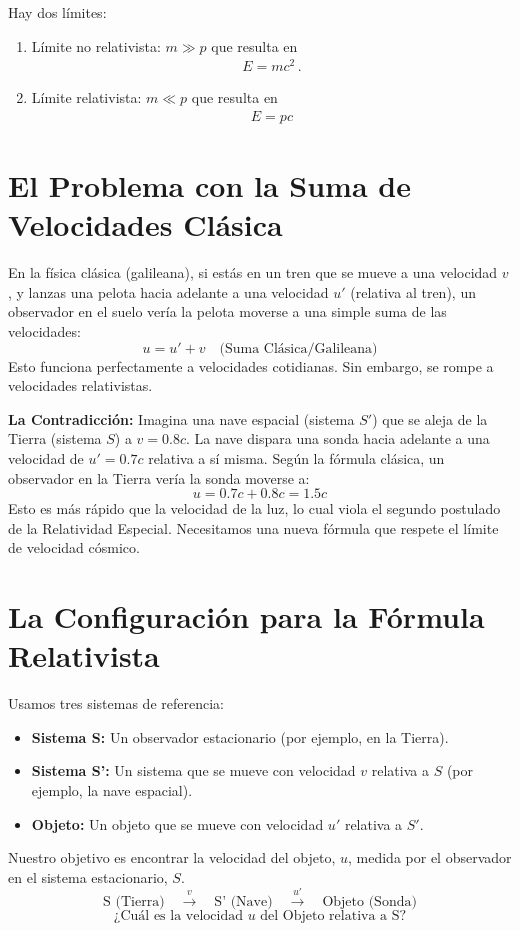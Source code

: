 \documentclass[11pt,a4paper]{article}
\begin{document}
Hay dos límites:

\begin{enumerate}
    \item Límite no relativista: $m\gg p$ que resulta en 
    \begin{align*}
        E = m c^2\,.
    \end{align*}
    \item Límite relativista: $m \ll p$ que resulta en
    \begin{align*}
        E = pc
    \end{align*}
\end{enumerate}



\section{El Problema con la Suma de Velocidades Clásica}

En la física clásica (galileana), si estás en un tren que se mueve a una velocidad $v$, y lanzas una pelota hacia adelante a una velocidad $u'$ (relativa al tren), un observador en el suelo vería la pelota moverse a una simple suma de las velocidades:
\[ u = u' + v \quad \text{(Suma Clásica/Galileana)} \]
Esto funciona perfectamente a velocidades cotidianas. Sin embargo, se rompe a velocidades relativistas.

\textbf{La Contradicción:} Imagina una nave espacial (sistema $S'$) que se aleja de la Tierra (sistema $S$) a $v=0.8c$. La nave dispara una sonda hacia adelante a una velocidad de $u'=0.7c$ relativa a sí misma. Según la fórmula clásica, un observador en la Tierra vería la sonda moverse a:
\[ u = 0.7c + 0.8c = 1.5c \]
Esto es más rápido que la velocidad de la luz, lo cual viola el segundo postulado de la Relatividad Especial. Necesitamos una nueva fórmula que respete el límite de velocidad cósmico.

\section{La Configuración para la Fórmula Relativista}

Usamos tres sistemas de referencia:
\begin{itemize}
    \item \textbf{Sistema S:} Un observador estacionario (por ejemplo, en la Tierra).
    \item \textbf{Sistema S':} Un sistema que se mueve con velocidad $v$ relativa a $S$ (por ejemplo, la nave espacial).
    \item \textbf{Objeto:} Un objeto que se mueve con velocidad $u'$ relativa a $S'$.
\end{itemize}
Nuestro objetivo es encontrar la velocidad del objeto, \textbf{$u$}, medida por el observador en el sistema estacionario, $S$.
\[
\text{S (Tierra)} \quad \xrightarrow{v} \quad \text{S' (Nave)} \quad \xrightarrow{u'} \quad \text{Objeto (Sonda)}
\]
\[
\text{¿Cuál es la velocidad } u \text{ del Objeto relativa a S?}
\]
\end{document}
